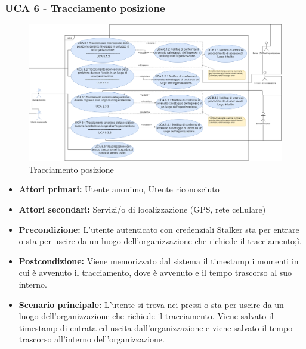 \newpage

\subsubsection{UCA 6 - Tracciamento posizione}%

\begin{figure}[h]
	\centering
	\includegraphics[scale=0.3]{sezioni/UseCase/Immagini/UCA6.png}
	\caption{Tracciamento posizione}
\end{figure}

\begin{itemize}
	\item \textbf{Attori primari:} Utente anonimo, Utente riconosciuto
	\item \textbf{Attori secondari:} Servizi/o di localizzazione (GPS, rete cellulare)
	\item \textbf{Precondizione:} L'utente autenticato con credenziali Stalker sta per entrare o sta per uscire da un luogo dell'organizzazione che richiede il tracciamento;ì.
	\item \textbf{Postcondizione:} Viene memorizzato dal sistema il timestamp i momenti in cui è avvenuto il tracciamento, dove è avvenuto e il tempo trascorso al suo interno.
	\item \textbf{Scenario principale:} L'utente si trova nei pressi o sta per uscire da un luogo dell'organizzazione che richiede il tracciamento. Viene salvato il timestamp di entrata ed uscita dall'organizzazione e viene salvato il tempo trascorso all'interno dell'organizzazione.
\end{itemize}

